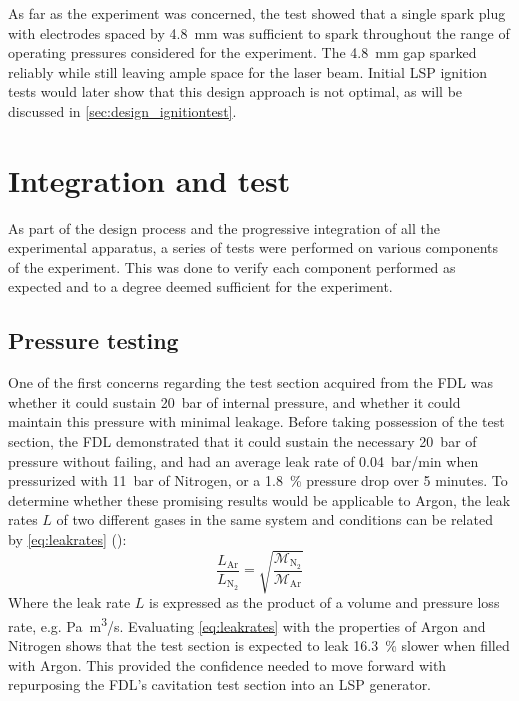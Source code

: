             As far as the experiment was concerned, the test showed that a single spark plug with electrodes spaced by 4.8~mm was sufficient to spark throughout the range of operating pressures considered for the experiment. The 4.8~mm gap sparked reliably while still leaving ample space for the laser beam. Initial LSP ignition tests would later show that this design approach is not optimal, as will be discussed in \autoref{sec:design_ignitiontest}.


    \section{Integration and test}
        As part of the design process and the progressive integration of all the experimental apparatus, a series of tests were performed on various components of the experiment. This was done to verify each component performed as expected and to a degree deemed sufficient for the experiment.
        
        \subsection{Pressure testing}
            One of the first concerns regarding the test section acquired from the FDL was whether it could sustain 20~bar of internal pressure, and whether it could maintain this pressure with minimal leakage. Before taking possession of the test section, the FDL demonstrated that it could sustain the necessary \qty{20}{bar} of pressure without failing, and had an average leak rate of \qty{0.04}{bar/min} when pressurized with \qty{11}{bar} of Nitrogen, or a 1.8~\% pressure drop over 5 minutes. To determine whether these promising results would be applicable to Argon, the leak rates $L$ of two different gases in the same system and conditions can be related by \autoref{eq:leakrates} (\textcite{greenhouseHermeticityElectronicPackages2012}):
            \begin{equation}
                \frac{L_\mathrm{Ar}}{L_{\mathrm{N}_2}} = \sqrt{\frac{\mathcal{M}_{\mathrm{N}_2}}{\mathcal{M}_\mathrm{Ar}}}
                \label{eq:leakrates}
            \end{equation}
            Where the leak rate $L$ is expressed as the product of a volume and pressure loss rate, e.g. \unit{Pa.m^3/s}. Evaluating \autoref{eq:leakrates} with the properties of Argon and Nitrogen shows that the test section is expected to leak 16.3~\% slower when filled with Argon. This provided the confidence needed to move forward with repurposing the FDL's cavitation test section into an LSP generator.
            
